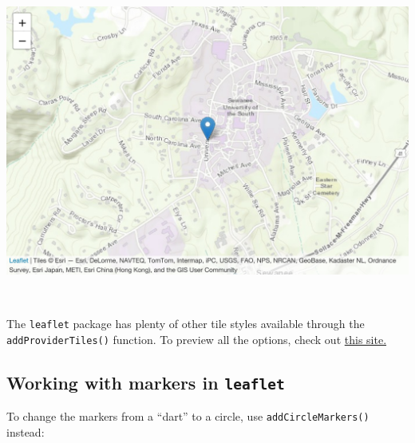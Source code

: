 \documentclass[
]{book}
\newenvironment{Shaded}{\begin{snugshade}}{\end{snugshade}}
\newcommand{\AttributeTok}[1]{\textcolor[rgb]{0.77,0.63,0.00}{#1}}
\newcommand{\DecValTok}[1]{\textcolor[rgb]{0.00,0.00,0.81}{#1}}
\newcommand{\FunctionTok}[1]{\textcolor[rgb]{0.00,0.00,0.00}{#1}}
\newcommand{\NormalTok}[1]{#1}
\newcommand{\SpecialCharTok}[1]{\textcolor[rgb]{0.00,0.00,0.00}{#1}}
\newcommand{\StringTok}[1]{\textcolor[rgb]{0.31,0.60,0.02}{#1}}
\begin{document}
\includegraphics[width=694.08px]{figures/unnamed-chunk-225-1}

~

The \texttt{leaflet} package has plenty of other tile styles available through the \texttt{addProviderTiles()} function. To preview all the options, check out \href{https://leaflet-extras.github.io/leaflet-providers/preview/}{this site.}

\hypertarget{working-with-markers-in-leaflet}{%
\subsection*{\texorpdfstring{Working with markers in \texttt{leaflet}}{Working with markers in leaflet}}\label{working-with-markers-in-leaflet}}

To change the markers from a ``dart'' to a circle, use \texttt{addCircleMarkers()} instead:

\begin{Shaded}
\end{Shaded}
\end{document}
